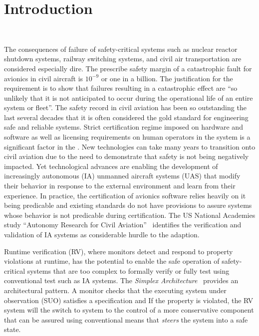 \section{Introduction}~\label{sec:intro} 

The consequences of failure of safety-critical systems such as nuclear
reactor shutdown systems, railway switching systems, and civil air
transportation are considered especially dire. The prescribe safety
margin of a catastrophic fault for avionics in civil aircraft is
$10^{-9}$ or one in a billion.  The justification for the requirement
is to show that failures resulting in a catastrophic effect are ``so
unlikely that it is not anticipated to occur during the operational
life of an entire system or fleet''\cite{FAA2000}.  The safety record
in civil aviation has been so outstanding the last several decades
that it is often considered the gold standard for engineering safe and
reliable systems. Strict certification regime imposed on hardware and
software as well as licensing requirements on human operators in the
system is a significant factor in the .  New technologies can take
many years to transition onto civil aviation due to the need to
demonstrate that safety is not being negatively impacted. Yet
technological advances are enabling the development of increasingly
autonomous (IA) unmanned aircraft systems (UAS) that modify their
behavior in response to the external environment and learn from their
experience.  In practice, the certification of avionics software
relies heavily on it being predicable and existing standards do not
have provisions to assure systems whose behavior is not predicable
during certification.  The US National Academies study ``Autonomy
Research for Civil Aviation''~\cite{NRC14} identifies the verification
and validation of IA systems as considerable hurdle to the adaption.



Runtime verification (RV), where monitors detect and respond to
property violations at runtime, has the potential to enable the safe
operation of safety-critical systems that are too complex to formally
verify or fully test using conventional test such as IA systems. The
\emph{Simplex Architecture}~\cite{simplex} provides an architectural
pattern. A monitor checks that the executing system under observation
(SUO) satisfies a specification and If the property is violated, the
RV system will the switch to system to the control of a more
conservative component that can be assured using conventional means
that \emph{steers} the system into a safe state.   



